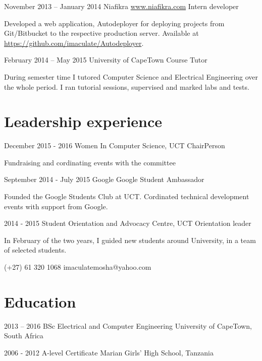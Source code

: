 \documentclass[fontsize=9pt]{tccv}
\begin{document}
\begin{eventlist}
\item{November 2013 -- January 2014}
     {Niafikra \url{www.niafikra.com}}
     {Intern developer}

Developed a web application, Autodeployer for deploying projects from Git/Bitbucket to the respective
production server. Available at \url{https://github.com/imaculate/Autodeployer}.

\item{February 2014 -- May 2015}
     {University of CapeTown}
     {Course Tutor}

During semester time I tutored Computer Science and Electrical Engineering over the whole period. I ran tutorial sessions, supervised and marked labs and tests.

\end{eventlist}

\section{Leadership experience}

\begin{eventlist}
\item{December 2015 - 2016}
	{Women In Computer Science, UCT}
	{ChairPerson}
	
Fundraising and cordinating events with the committee

\item{September 2014 - July 2015}
{Google}
{Google Student Ambassador}

Founded the Google Students Club at UCT. Cordinated technical development events with support from Google.

\item{2014 - 2015}
{Student Orientation and Advocacy Centre, UCT}
{Orientation leader}

In February of the two years, I guided new students around University, in a team of selected students.

\end{eventlist}
    {(+27) 61 320 1068}
    {imaculatemosha@yahoo.com}

\section{Education}

\begin{yearlist}

\item{2013 -- 2016}
     {BSc Electrical and Computer Engineering}
     {University of CapeTown, South Africa}

\item{2006 - 2012}
     {A-level Certificate}
     {Marian Girls' High School, Tanzania}

\end{yearlist}
\end{document}
